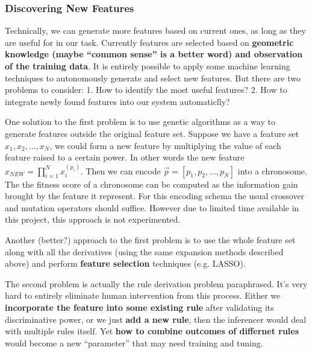 \subsubsection{Discovering New Features}

Technically, we can generate more features based on current ones, as long as they are useful for in our task. Currently features are selected based on \textbf{geometric knowledge (maybe ``common sense'' is a better word) and observation of the training data}. It is entirely possible to apply some machine learning techniques to autonomously generate and select new features. But there are two problems to consider: 1. How to identify the most useful features? 2. How to integrate newly found features into our system automaticlly?

One solution to the first problem is to use genetic algorithms as a way to generate features outside the original feature set. Suppose we have a feature set $x_1, x_2, ..., x_N$, we could form a new feature by multiplying the value of each feature raised to a certain power. In other words the new feature $x_{NEW} = \prod_{i=1}^{N} x_i^(p_i)$. Then we can encode $\vec{p} = [p_1, p_2, ..., p_N]$ into a chronosome. The the fitness score of a chronosome can be computed as the information gain brought by the feature it represent. For this encoding schema the usual crossover and mutation operators should suffice. However due to limited time available in this project, this approach is not experimented.

Another (better?) approach to the first problem is to use the whole feature set along with all the derivatives (using the same expansion methods described above) and perform \textbf{feature selection} techniques (e.g. LASSO).

The second problem is actually the rule derivation problem paraphrased. It's very hard to entirely eliminate human intervention from this process. Either we \textbf{incorporate the feature into some existing rule} after validating its discriminative power, or we just \textbf{add a new rule}, then the inferencer would deal with multiple rules itself. Yet \textbf{how to combine outcomes of differnet rules} would become a new ``parameter'' that may need training and tuning.

